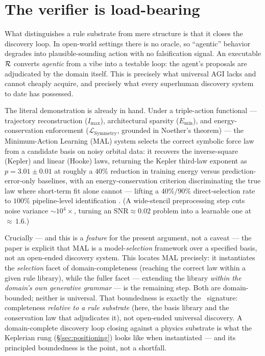\section{The verifier is load-bearing}
\label{sec:verifier}

What distinguishes a rule substrate from mere structure is that it closes the discovery loop. In open-world settings there is no oracle, so ``agentic'' behavior degrades into plausible-sounding action with no falsification signal. An executable $\mathcal{R}$ converts \emph{agentic} from a vibe into a testable loop: the agent's proposals are adjudicated by the domain itself. This is precisely what universal AGI lacks and cannot cheaply acquire, and precisely what every superhuman discovery system to date has possessed.

The literal demonstration is already in hand. Under a triple-action functional --- trajectory reconstruction ($I_{\max}$), architectural sparsity ($E_{\min}$), and energy-conservation enforcement ($\mathcal{L}_{\mathrm{Symmetry}}$, grounded in Noether's theorem) --- the Minimum-Action Learning (MAL) system selects the correct symbolic force law from a candidate basis on noisy orbital data: it recovers the inverse-square (Kepler) and linear (Hooke) laws, returning the Kepler third-law exponent as $p = 3.01 \pm 0.01$ at roughly a $40\%$ reduction in training energy versus prediction-error-only baselines, with an energy-conservation criterion discriminating the true law where short-term fit alone cannot --- lifting a $40\%/90\%$ direct-selection rate to $100\%$ pipeline-level identification \citep{frasch2026b}. (A wide-stencil preprocessing step cuts noise variance ${\sim}10^{4}\times$, turning an $\mathrm{SNR}\approx 0.02$ problem into a learnable one at ${\approx}\,1.6$.)

Crucially --- and this is a \emph{feature} for the present argument, not a caveat --- the paper is explicit that MAL is a model-\emph{selection} framework over a specified basis, not an open-ended discovery system. This locates MAL precisely: it instantiates the \emph{selection} facet of domain-completeness (reaching the correct law within a given rule library), while the fuller facet --- extending the library \emph{within the domain's own generative grammar} --- is the remaining step. Both are domain-bounded; neither is universal. That boundedness is exactly the \DCI\ signature: completeness \emph{relative to a rule substrate} (here, the basis library and the conservation law that adjudicates it), not open-ended universal discovery. A domain-complete discovery loop closing against a physics substrate is what the Keplerian rung (\S\ref{sec:positioning}) looks like when instantiated --- and its principled boundedness is the point, not a shortfall.
